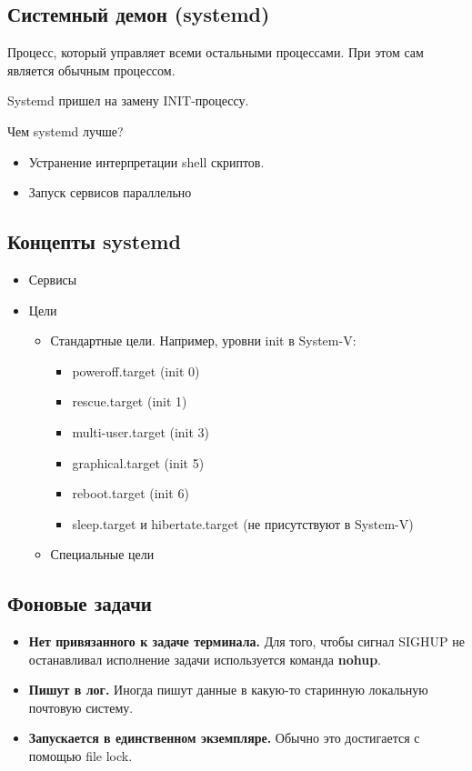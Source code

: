 \subsection{Системный демон (systemd)}

Процесс, который управляет всеми остальными процессами. При этом сам является
обычным процессом.

Systemd пришел на замену INIT-процессу.

Чем systemd лучше?
\begin{itemize}
	\item Устранение интерпретации shell скриптов. 
	\item Запуск сервисов параллельно
\end{itemize}

\subsection{Концепты systemd}

\begin{itemize}
	\item Сервисы
	\item Цели
		\begin{itemize}
			\item Стандартные цели. Например, уровни init в System-V:
				\begin{itemize}
					\item poweroff.target (init 0)
					\item rescue.target (init 1)
					\item multi-user.target (init 3)
					\item graphical.target (init 5)
					\item reboot.target (init 6)
					\item sleep.target и hibertate.target (не присутствуют в System-V)
				\end{itemize}
			\item Специальные цели
		\end{itemize}
\end{itemize}

\subsection{Фоновые задачи}

\begin{itemize}
	\item \textbf{Нет привязанного к задаче терминала.} Для того, чтобы сигнал SIGHUP
	не останавливал исполнение задачи используется команда \textbf{nohup}.
	\item \textbf{Пишут в лог.} Иногда пишут данные в какую-то старинную 
	локальную почтовую систему.
	\item \textbf{Запускается в единственном экземпляре.} Обычно это достигается
	с помощью file lock.
\end{itemize}

